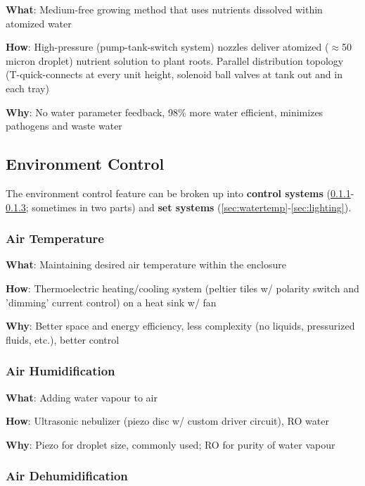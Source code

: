 \documentclass{report}
\begin{document}
\textbf{What}: Medium-free growing method that uses nutrients dissolved within atomized water

\textbf{How}: High-pressure (pump-tank-switch system) nozzles deliver atomized ($\approx$50 micron droplet) nutrient solution to plant roots. Parallel distribution topology (T-quick-connects at every unit height, solenoid ball valves at tank out and in each tray)

\textbf{Why}: No water parameter feedback, 98\% more water efficient, minimizes pathogens and waste water

\newpage

\subsection{Environment Control}
\label{sec:environment}

The environment control feature can be broken up into \textbf{control systems} (\ref{sec:airtemp}-\ref{sec:dehum}; sometimes in two parts) and \textbf{set systems} (\ref{sec:watertemp}-\ref{sec:lighting}).

\subsubsection{Air Temperature}
\label{sec:airtemp}

\textbf{What}: Maintaining desired air temperature within the enclosure

\textbf{How}: Thermoelectric heating/cooling system (peltier tiles w/ polarity switch and 'dimming' current control) on a heat sink w/ fan

\textbf{Why}: Better space and energy efficiency, less complexity (no liquids, pressurized fluids, etc.), better control

\subsubsection{Air Humidification}
\label{sec:airhum}

\textbf{What}: Adding water vapour to air

\textbf{How}: Ultrasonic nebulizer (piezo disc w/ custom driver circuit), RO water

\textbf{Why}: Piezo for droplet size, commonly used; RO for purity of water vapour

\subsubsection{Air Dehumidification}
\label{sec:dehum}
\end{document}
